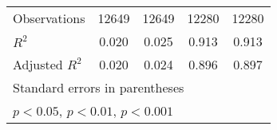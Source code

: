 {\begin{tabular}{l*{4}{c}}
\hline
Observations        &       12649         &       12649         &       12280         &       12280         \\
\(R^{2}\)           &       0.020         &       0.025         &       0.913         &       0.913         \\
Adjusted \(R^{2}\)  &       0.020         &       0.024         &       0.896         &       0.897         \\
\hline\hline
\multicolumn{5}{l}{\footnotesize Standard errors in parentheses}\\
\multicolumn{5}{l}{\footnotesize \sym{*} \(p<0.05\), \sym{**} \(p<0.01\), \sym{***} \(p<0.001\)}\\
\end{tabular}
}
